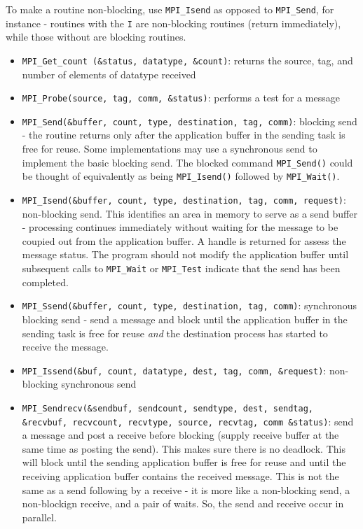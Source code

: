 \documentclass[10pt]{article}
\begin{document}
\begin{flushleft}
To make a routine non-blocking, use {\tt MPI\_Isend} as opposed to {\tt MPI\_Send}, for instance - routines with the {\tt I} are non-blocking routines (return immediately), while those without are blocking routines.

\begin{itemize}
\item {\tt MPI\_Get\_count (\&status, datatype, \&count)}: returns the source, tag, and number of elements of datatype received
\item {\tt MPI\_Probe(source, tag, comm, \&status)}: performs a test for a message
\item {\tt MPI\_Send(\&buffer, count, type, destination, tag, comm)}: blocking send - the routine returns only after the application buffer in the sending task is free for reuse. Some implementations may use a synchronous send to implement the basic blocking send. The blocked command {\tt MPI\_Send()} could be thought of equivalently as being {\tt MPI\_Isend()} followed by {\tt MPI\_Wait()}. 
\item {\tt MPI\_Isend(\&buffer, count, type, destination, tag, comm, request)}: non-blocking send. This identifies an area in memory to serve as a send buffer - processing continues immediately without waiting for the message to be coupied out from the application buffer. A handle is returned for assess the message status. The program should not modify the application buffer until subsequent calls to {\tt MPI\_Wait} or {\tt MPI\_Test} indicate that the send has been completed.
\item {\tt MPI\_Ssend(\&buffer, count, type, destination, tag, comm)}: synchronous blocking send - send a message and block until the application buffer in the sending task is free for reuse \textit{and} the destination process has started to receive the message. 
\item {\tt MPI\_Issend(\&buf, count, datatype, dest, tag, comm, \&request)}: non-blocking synchronous send
\item {\tt MPI\_Sendrecv(\&sendbuf, sendcount, sendtype, dest, sendtag, \&recvbuf, recvcount, recvtype, source, recvtag, comm \&status)}: send a message and post a receive before blocking (supply receive buffer at the same time as posting the send). This makes sure there is no deadlock. This will block until the sending application buffer is free for reuse and until the receiving application buffer contains the received message. This is not the same as a send following by a receive - it is more like a non-blocking send, a non-blockign receive, and a pair of waits. So, the send and receive occur in parallel. 

\end{itemize}
\end{flushleft}
\end{document}

